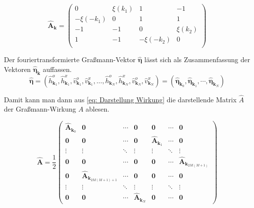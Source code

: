 \begin{equation}
    \bm{\hat{A}}_{\bm{k}} = \left(\begin{array}{cccc} 
        0         &\xi(k_1)  &  1       & -1        \\
        -\xi(-k_1)&0         &  1       &  1        \\
        -1        &-1        &  0       & \xi(k_2)  \\
        1         &-1        &-\xi(-k_2)&  0        \\
    \end{array}\right) 
\end{equation}

\noindent Der fouriertransformierte Graßmann-Vektor $\bm{\hat{\eta}}$ lässt sich als Zusammenfassung der Vektoren $\bm{\hat{\eta}}_{\bm{k}}$ auffassen.
\begin{equation}
\bm{\hat{\eta}} = \left(\hat{h}_{\bm{k}_1}^o, \hat{h}_{\bm{k}_1}^x, \hat{v}_{\bm{k}_1}^o, \hat{v}_{\bm{k}_1}^x, \dots, \hat{h}_{\bm{k}_N}^o, \hat{h}_{\bm{k}_N}^x, \hat{v}_{\bm{k}_N}^o, \hat{v}_{\bm{k}_N}^x \right) = \left(\bm{\hat{\eta}}_{\bm{k}_0}, \bm{\hat{\eta}}_{\bm{k}_1}, \cdots, \bm{\hat{\eta}}_{\bm{k}_N}  \right)
\end{equation}

\noindent Damit kann man dann aus \eqref{eq: Darstellung Wirkung} die darstellende Matrix $\hat{A}$ der Graßmann-Wirkung $A$ ablesen. 
\begin{grayframe}[frametitle = { Darstellende Matrix der Fouriertransformierten Graßmann-Wikrung $\hat{A}$ }]
\begin{equation}
\renewcommand{\arraystretch}{1.5}
\bm{\hat{A}} = \frac{1}{2}
\left(\begin{array}{c|ccc|ccc}  
\bm{\hat{A}}_{\bm{k}_0}  & \bm{0}   & \cdots    & \bm{0} & \bm{0} & \cdots  & \bm{0} \\ \hline
\bm{0}  & \bm{0}       & \cdots   & \bm{0}    & \bm{\hat{A}}_{\bm{k}_1} & \cdots  & \bm{0} \\
\vdots  &\vdots        & \ddots   & \vdots    & \vdots                  & \ddots  & \vdots \\
\bm{0}  & \bm{0}       & \cdots   & \bm{0} & \bm{0} & \cdots  & \bm{\hat{A}}_{\bm{k}_{2M(M+1)}}  \\ \hline
\bm{0}  & \bm{\hat{A}}_{\bm{k}_{2M(M+1)+1}} & \cdots  & \bm{0} & \bm{0} & \cdots  & \bm{0} \\
\vdots  &\vdots        & \ddots   & \vdots    & \vdots                  & \ddots  & \vdots \\
\bm{0}  & \bm{0}       & \cdots   &\bm{\hat{A}}_{\bm{k}_{N}} & \bm{0} & \cdots  & \bm{0} 
\end{array} \right) 
\end{equation}
\end{grayframe}

